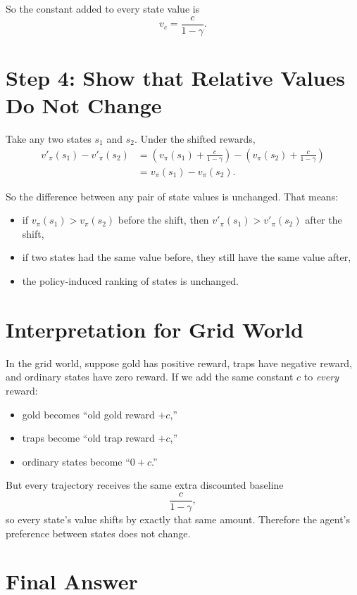 \documentclass[11pt]{article}
\begin{document}
So the constant added to every state value is
\[
    \boxed{v_c = \frac{c}{1-\gamma}}.
\]

\section*{Step 4: Show that Relative Values Do Not Change}

Take any two states \(s_1\) and \(s_2\). Under the shifted rewards,
\[
\begin{aligned}
    v'_\pi(s_1) - v'_\pi(s_2)
    &=
    \left(v_\pi(s_1) + \frac{c}{1-\gamma}\right)
    -
    \left(v_\pi(s_2) + \frac{c}{1-\gamma}\right) \\
    &= v_\pi(s_1) - v_\pi(s_2).
\end{aligned}
\]

So the difference between any pair of state values is unchanged. That means:
\begin{itemize}
    \item if \(v_\pi(s_1) > v_\pi(s_2)\) before the shift, then
    \(v'_\pi(s_1) > v'_\pi(s_2)\) after the shift,
    \item if two states had the same value before, they still have the same value
    after,
    \item the policy-induced ranking of states is unchanged.
\end{itemize}

\section*{Interpretation for Grid World}

In the grid world, suppose gold has positive reward, traps have negative reward,
and ordinary states have zero reward. If we add the same constant \(c\) to
\emph{every} reward:
\begin{itemize}
    \item gold becomes ``old gold reward \(+c\),''
    \item traps become ``old trap reward \(+c\),''
    \item ordinary states become ``\(0+c\).''
\end{itemize}

But every trajectory receives the same extra discounted baseline
\[
    \frac{c}{1-\gamma},
\]
so every state's value shifts by exactly that same amount. Therefore the agent's
preference between states does not change.

\section*{Final Answer}
\end{document}
